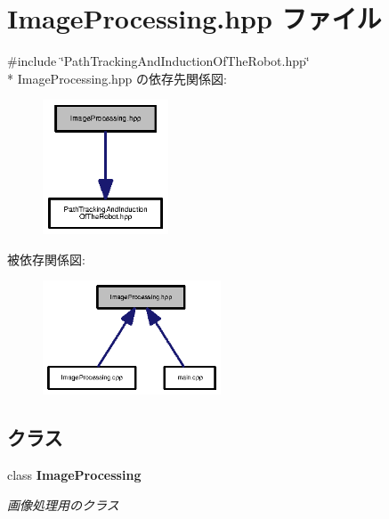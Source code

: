 \section{Image\-Processing.\-hpp ファイル}
\label{_image_processing_8hpp}
{\ttfamily \#include \char`\"{}Path\-Tracking\-And\-Induction\-Of\-The\-Robot.\-hpp\char`\"{}}\\*
Image\-Processing.\-hpp の依存先関係図\-:\nopagebreak
\begin{figure}[H]
\begin{center}
\leavevmode
\includegraphics[width=106pt]{_image_processing_8hpp__incl}
\end{center}
\end{figure}
被依存関係図\-:\nopagebreak
\begin{figure}[H]
\begin{center}
\leavevmode
\includegraphics[width=150pt]{_image_processing_8hpp__dep__incl}
\end{center}
\end{figure}
\subsection*{クラス}
\begin{DoxyCompactItemize}
\item 
class {\bf Image\-Processing}
\begin{DoxyCompactList}\small\item\em 画像処理用のクラス \end{DoxyCompactList}\end{DoxyCompactItemize}
